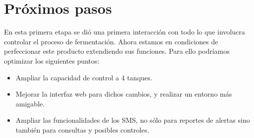 \section{Próximos pasos}

En esta primera etapa se dió una primera interacción con todo lo que involucra controlar el proceso de fermentación. Ahora estamos en condiciones de perfeccionar este producto extendiendo sus funciones.
Para ello podríamos optimizar los siguientes puntos:
  \begin{itemize}
    \item Ampliar la capacidad de control a 4 tanques.
    \item Mejorar la interfaz web para dichos cambios, y realizar un entorno más amigable.
    \item Ampliar las funcionalidades de los SMS, no sólo para reportes de alertas sino también para consultas y posibles controles. 
   \end{itemize} 


